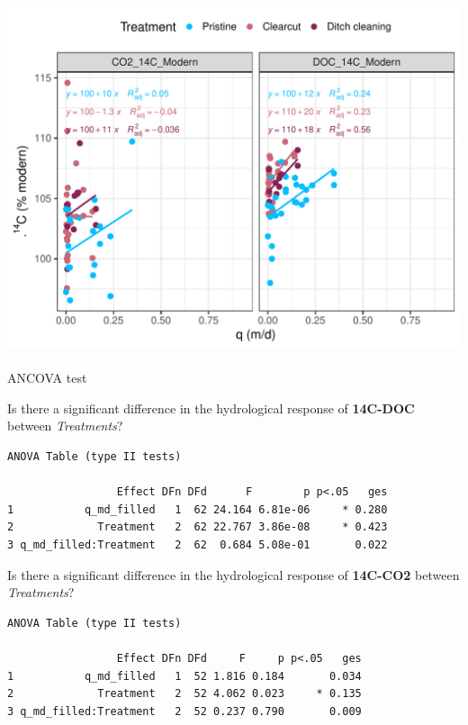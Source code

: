 \documentclass[
  letterpaper,
  DIV=11,
  numbers=noendperiod]{scrartcl}
\makeatletter
\let\oldparagraph\paragraph
\renewcommand{\paragraph}{
    \@ifstar
      \xxxParagraphStar
      \xxxParagraphNoStar
  }
\newcommand{\xxxParagraphStar}[1]{\oldparagraph*{#1}\mbox{}}
\newcommand{\xxxParagraphNoStar}[1]{\oldparagraph{#1}\mbox{}}
\makeatother
\begin{document}
\includegraphics{index_files/figure-pdf/unnamed-chunk-8-1.pdf}

\paragraph{ANCOVA test}\label{ancova-test}

Is there a significant difference in the hydrological response of
\textbf{14C-DOC} between \emph{Treatments}?

\begin{verbatim}
ANOVA Table (type II tests)

                 Effect DFn DFd      F        p p<.05   ges
1           q_md_filled   1  62 24.164 6.81e-06     * 0.280
2             Treatment   2  62 22.767 3.86e-08     * 0.423
3 q_md_filled:Treatment   2  62  0.684 5.08e-01       0.022
\end{verbatim}

Is there a significant difference in the hydrological response of
\textbf{14C-CO2} between \emph{Treatments}?

\begin{verbatim}
ANOVA Table (type II tests)

                 Effect DFn DFd     F     p p<.05   ges
1           q_md_filled   1  52 1.816 0.184       0.034
2             Treatment   2  52 4.062 0.023     * 0.135
3 q_md_filled:Treatment   2  52 0.237 0.790       0.009
\end{verbatim}
\end{document}
